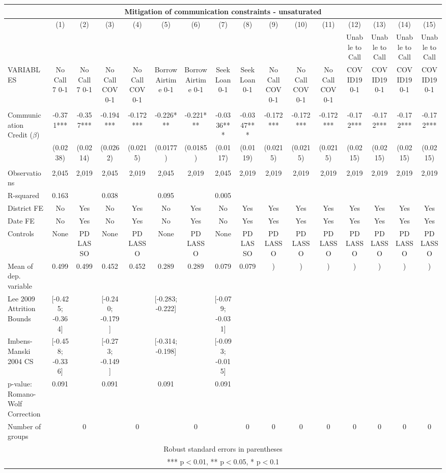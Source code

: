 \begin{tabular}{lccccccccccccccc}
\multicolumn{16}{c}{Mitigation of communication constraints - unsaturated} \\ \hline
 & (1) & (2) & (3) & (4) & (5) & (6) & (7) & (8) & (9) & (10) & (11) & (12) & (13) & (14) & (15) \\
 &  &  &  &  &  &  &  &  &  &  &  & Unable to Call & Unable to Call & Unable to Call & Unable to Call \\
VARIABLES & No Call 7 0-1 & No Call 7 0-1 & No Call COV 0-1 & No Call COV 0-1 & Borrow Airtime 0-1 & Borrow Airtime 0-1 & Seek Loan 0-1 & Seek Loan 0-1 & No Call COV 0-1 & No Call COV 0-1 & No Call COV 0-1 & COVID19 0-1 & COVID19 0-1 & COVID19 0-1 & COVID19 0-1 \\ \hline
 &  &  &  &  &  &  &  &  &  &  &  &  &  &  &  \\
Communication Credit ($\beta$) & -0.371*** & -0.357*** & -0.194*** & -0.172*** & -0.226*** & -0.221*** & -0.0336*** & -0.0347*** & -0.172*** & -0.172*** & -0.172*** & -0.172*** & -0.172*** & -0.172*** & -0.172*** \\
 & (0.0238) & (0.0214) & (0.0262) & (0.0215) & (0.0177) & (0.0185) & (0.0117) & (0.0119) & (0.0215) & (0.0215) & (0.0215) & (0.0215) & (0.0215) & (0.0215) & (0.0215) \\
 &  &  &  &  &  &  &  &  &  &  &  &  &  &  &  \\
Observations & 2,045 & 2,019 & 2,045 & 2,019 & 2,045 & 2,019 & 2,045 & 2,019 & 2,019 & 2,019 & 2,019 & 2,019 & 2,019 & 2,019 & 2,019 \\
R-squared & 0.163 &  & 0.038 &  & 0.095 &  & 0.005 &  &  &  &  &  &  &  &  \\
District FE & No & Yes & No & Yes & No & Yes & No & Yes & Yes & Yes & Yes & Yes & Yes & Yes & Yes \\
Date FE & No & Yes & No & Yes & No & Yes & No & Yes & Yes & Yes & Yes & Yes & Yes & Yes & Yes \\
Controls & None & PD LASSO & None & PD LASSO & None & PD LASSO & None & PD LASSO & PD LASSO & PD LASSO & PD LASSO & PD LASSO & PD LASSO & PD LASSO & PD LASSO \\
Mean of dep. variable & 0.499 & 0.499 & 0.452 & 0.452 & 0.289 & 0.289 & 0.079 & 0.079 & ) & ) & ) & ) & ) & ) & ) \\
Lee 2009 Attrition Bounds & [-0.425; -0.364] &  & [-0.240; -0.179] &  & [-0.283; -0.222] &  & [-0.079; -0.031] &  &  &  &  &  &  &  &  \\
Imbens-Manski 2004 CS & [-0.458; -0.336] &  & [-0.273; -0.149] &  & [-0.314; -0.198] &  & [-0.093; -0.015] &  &  &  &  &  &  &  &  \\
p-value: Romano-Wolf Correction & 0.091 &  & 0.091 &  & 0.091 &  & 0.091 &  &  &  &  &  &  &  &  \\
 Number of groups &  & 0 &  & 0 &  & 0 &  & 0 & 0 & 0 & 0 & 0 & 0 & 0 & 0 \\ \hline
\multicolumn{16}{c}{ Robust standard errors in parentheses} \\
\multicolumn{16}{c}{ *** p$<$0.01, ** p$<$0.05, * p$<$0.1} \\
\end{tabular}
